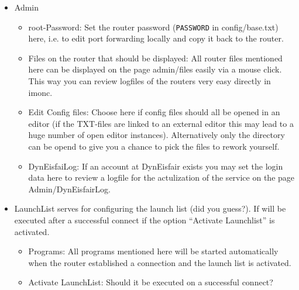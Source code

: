 \begin{itemize}
  \item Admin
    \begin{itemize}
      \item root-Password: Set the router password (\verb+PASSWORD+ in config/base.txt)
        here, i.e. to edit port forwarding locally and copy it back to the router.
      \item Files on the router that should be displayed: All router files mentioned here
        can be displayed on the page admin/files easily via a mouse click. This way you
        can review logfiles of the routers very easy directly in imonc.
      \item Edit Config files: Choose here if config files should all be opened in
	an editor (if the TXT-files are linked to an external editor this may lead
	to a huge number of open editor instances). Alternatively only the directory
	can be opend to give you a chance to pick the files to rework yourself.
      \item DynEisfaiLog: If an account at DynEisfair exists you may set the login
	data here to review a logfile for the actulization of the service on the page
	Admin/DynEisfairLog.
    \end{itemize}

  \item LaunchList serves for configuring the launch list (did you guess?).
    If will be executed after a successful connect if the option ``Activate Launchlist''
    is activated.
    \begin{itemize}
      \item Programs: All programs mentioned here will be started automatically
      when the router established a connection and the launch list is activated.
      \item Activate LaunchList: Should it be executed on a successful connect?
    \end{itemize}


\end{itemize}
